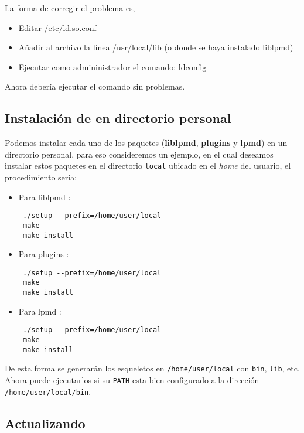 La forma de corregir el problema es,

\begin{itemize}
 \item Editar /etc/ld.so.conf
 \item A\~nadir al archivo la l\'inea /usr/local/lib (o donde se haya instalado liblpmd)
 \item Ejecutar como admininistrador el comando: ldconfig
\end{itemize}

Ahora deber\'ia ejecutar el comando sin problemas.

\subsection{Instalaci\'on de {\lpmd} en directorio personal}
\label{subsub:personaldir}

Podemos instalar cada uno de los paquetes (\textbf{liblpmd}, \textbf{plugins} y \textbf{lpmd}) en un directorio personal, para eso consideremos un ejemplo, en el cual deseamos instalar estos paquetes en el directorio \verb|local| ubicado en el \textit{home} del usuario, el procedimiento ser\'ia:

\begin{itemize}
 \item Para liblpmd :
 \begin{verbatim}
 ./setup --prefix=/home/user/local
 make
 make install
 \end{verbatim}
 \item Para plugins :
 \begin{verbatim}
 ./setup --prefix=/home/user/local
 make
 make install
 \end{verbatim}
 \item Para lpmd :
 \begin{verbatim}
 ./setup --prefix=/home/user/local
 make
 make install
 \end{verbatim}
\end{itemize}

De esta forma se generar\'an los esqueletos en \verb|/home/user/local| con \verb|bin|, \verb|lib|, etc. Ahora puede ejecutarlos si su \verb|PATH| esta bien configurado a la direcci\'on \verb|/home/user/local/bin|.


\subsection{Actualizando {\lpmd}}

